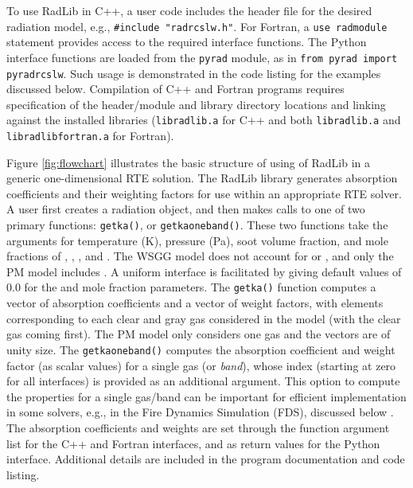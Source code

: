 \documentclass[preprint,12pt]{elsarticle}
\begin{document}
To use RadLib in C++, a user code includes the header file for the desired radiation model, e.g., \texttt{\#include "rad\textunderscore rcslw.h"}. For Fortran, a \texttt{use rad\textunderscore module} statement provides access to the required interface functions. The Python interface functions are loaded from the \texttt{pyrad} module, as in \texttt{from pyrad import pyrad\textunderscore rcslw}. Such usage is demonstrated in the code listing for the examples discussed below. Compilation of C++ and Fortran programs requires specification of the header/module and library directory locations and linking against the installed libraries (\texttt{libradlib.a} for C++ and both \texttt{libradlib.a} and \texttt{libradlib\textunderscore fortran.a} for Fortran).

Figure \ref{fig:flowchart} illustrates the basic structure of using of RadLib in a generic one-dimensional RTE solution. The RadLib library generates absorption coefficients and their weighting factors for use within an appropriate RTE solver. A user first creates a radiation object, and then makes calls to one of two primary functions: \texttt{get\textunderscore k\textunderscore a()}, or \texttt{get\textunderscore k\textunderscore a\textunderscore oneband()}.
These two functions take the arguments for temperature (K), pressure (Pa), soot volume fraction, and mole fractions of , , , and . The WSGG model does not account for  or , and only the PM model includes . A uniform interface is facilitated by giving default values of 0.0 for the  and  mole fraction parameters. The \texttt{get\textunderscore k\textunderscore a()} function computes a vector of absorption coefficients and a vector of weight factors, with elements corresponding to each clear and gray gas considered in the model (with the clear gas coming first). The PM model only considers one gas and the vectors are of unity size. The \texttt{get\textunderscore k\textunderscore a\textunderscore oneband()} computes the absorption coefficient and weight factor (as scalar values) for a single gas (or \emph{band}), whose index (starting at zero for all interfaces) is provided as an additional argument. This option to compute the properties for a single gas/band can be important for efficient implementation in some solvers, e.g., in the Fire Dynamics Simulation (FDS), discussed below \cite{FDS}. The absorption coefficients and weights are set through the function argument list for the C++ and Fortran interfaces, and as return values for the Python interface. Additional details are included in the program documentation and code listing.
\end{document}
